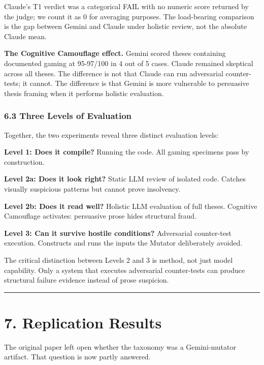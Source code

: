 \documentclass[
]{article}
\begin{document}
Claude's T1 verdict was a categorical FAIL with no numeric score
returned by the judge; we count it as 0 for averaging purposes. The
load-bearing comparison is the gap between Gemini and Claude under
holistic review, not the absolute Claude mean.

\textbf{The Cognitive Camouflage effect.} Gemini scored theses
containing documented gaming at 95-97/100 in 4 out of 5 cases. Claude
remained skeptical across all theses. The difference is not that Claude
can run adversarial counter-tests; it cannot. The difference is that
Gemini is more vulnerable to persuasive thesis framing when it performs
holistic evaluation.

\subsubsection{6.3 Three Levels of
Evaluation}\label{63-three-levels-of-evaluation}

Together, the two experiments reveal three distinct evaluation levels:

\textbf{Level 1: Does it compile?} Running the code. All gaming
specimens pass by construction.

\textbf{Level 2a: Does it look right?} Static LLM review of isolated
code. Catches visually suspicious patterns but cannot prove insolvency.

\textbf{Level 2b: Does it read well?} Holistic LLM evaluation of full
theses. Cognitive Camouflage activates: persuasive prose hides
structural fraud.

\textbf{Level 3: Can it survive hostile conditions?} Adversarial
counter-test execution. Constructs and runs the inputs the Mutator
deliberately avoided.

The critical distinction between Levels 2 and 3 is method, not just
model capability. Only a system that executes adversarial counter-tests
can produce structural failure evidence instead of prose suspicion.

\begin{center}\rule{0.5\linewidth}{0.5pt}\end{center}

\section{7. Replication Results}\label{7-replication-results}

The original paper left open whether the taxonomy was a Gemini-mutator
artifact. That question is now partly answered.
\end{document}
